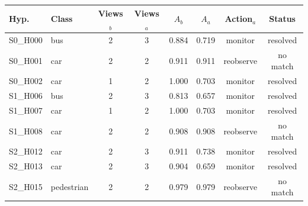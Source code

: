 \begin{tabular}{llcccccc}
\toprule
Hyp. & Class & Views$_{b}$ & Views$_{a}$ & $A_b$ & $A_a$ & Action$_a$ & Status \\
\midrule
S0\_H000 & bus & 2 & 3 & 0.884 & 0.719 & monitor & resolved \\
S0\_H001 & car & 2 & 2 & 0.911 & 0.911 & reobserve & no match \\
S0\_H002 & car & 1 & 2 & 1.000 & 0.703 & monitor & resolved \\
S1\_H006 & bus & 2 & 3 & 0.813 & 0.657 & monitor & resolved \\
S1\_H007 & car & 1 & 2 & 1.000 & 0.703 & monitor & resolved \\
S1\_H008 & car & 2 & 2 & 0.908 & 0.908 & reobserve & no match \\
S2\_H012 & car & 2 & 3 & 0.911 & 0.738 & monitor & resolved \\
S2\_H013 & car & 2 & 3 & 0.904 & 0.659 & monitor & resolved \\
S2\_H015 & pedestrian & 2 & 2 & 0.979 & 0.979 & reobserve & no match \\
\bottomrule
\end{tabular}

